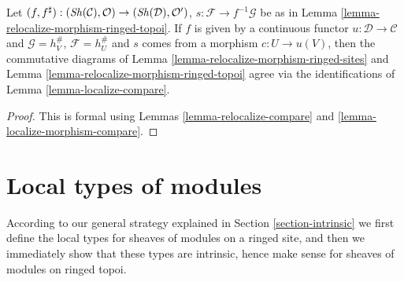 \begin{lemma}
\label{lemma-relocalize-morphism-compare}
Let
$(f, f^\sharp) :
(\mathop{\mathit{Sh}}\nolimits(\mathcal{C}), \mathcal{O})
\to
(\mathop{\mathit{Sh}}\nolimits(\mathcal{D}), \mathcal{O}')$,
$s : \mathcal{F} \to f^{-1}\mathcal{G}$ be as in
Lemma \ref{lemma-relocalize-morphism-ringed-topoi}.
If $f$ is given by a continuous functor
$u : \mathcal{D} \to \mathcal{C}$
and $\mathcal{G} = h_V^\#$,
$\mathcal{F} = h_U^\#$ and $s$ comes from a morphism
$c : U \to u(V)$, then
the commutative diagrams of
Lemma \ref{lemma-relocalize-morphism-ringed-sites}
and
Lemma \ref{lemma-relocalize-morphism-ringed-topoi}
agree via the identifications of
Lemma \ref{lemma-localize-compare}.
\end{lemma}

\begin{proof}
This is formal using
Lemmas \ref{lemma-relocalize-compare} and
\ref{lemma-localize-morphism-compare}.
\end{proof}

















\section{Local types of modules}
\label{section-local}

\noindent
According to our general strategy explained in Section \ref{section-intrinsic}
we first define the local types for sheaves of modules on a ringed site, and
then we immediately show that these types are intrinsic, hence make sense
for sheaves of modules on ringed topoi.

